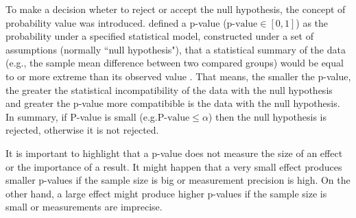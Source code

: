 To make a decision wheter to reject or accept the null hypothesis, the concept of
probability value was introduced.
 defined a p-value  ($\textrm{p-value}\in [0,1]$) as the probability under a specified statistical model, constructed under a set of assumptions (normally “null hypothesis"), that a statistical summary of the data
(e.g., the sample mean difference between two compared groups) would be equal to or more extreme than its observed value \cite{wasserstein2016asa}. That means, the smaller the p-value, the greater the statistical incompatibility of the data with the null hypothesis and greater the p-value more compatibible is the data with the null hypothesis.
In summary, if P-value is small (e.g.$\textrm{P-value} \leq \alpha$) then the null hypothesis is rejected,
otherwise it is not rejected.

It is important to highlight that a p-value does not measure the size of an effect or the importance of a result.
It might happen that a very small effect produces smaller p-values if the
sample size is big or measurement precision is high.
On the other hand, a large effect might produce higher p-values if
the sample size is small or measurements are imprecise.




